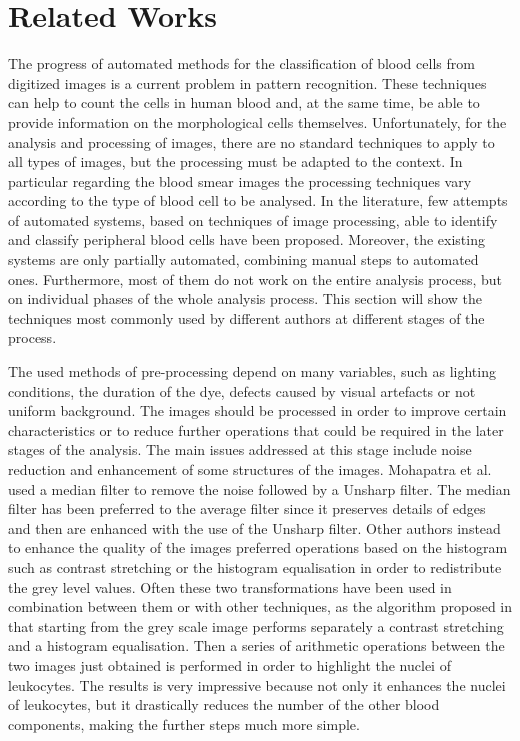 \documentclass[final,a4paper,12pt,english]{UnicaPhdThesis3}
\begin{document}
\section {Related Works}
The progress of automated methods for the classification of blood cells from digitized images is a current problem in pattern recognition. These techniques can help to count the cells in human blood and, at the same time, be able to provide information on the morphological cells themselves. Unfortunately, for the analysis and processing of images, there are no standard techniques to apply to all types of images, but the processing must be adapted to the context. In particular regarding the blood smear images the processing techniques vary according to the type of blood cell to be analysed. In the literature, few attempts of automated systems, based on techniques of image processing, able to identify and classify peripheral blood cells have been proposed. Moreover, the existing systems are only partially automated, combining manual steps to automated ones. Furthermore, most of them do not work on the entire analysis process, but on individual phases of the whole analysis process. This section will show the techniques most commonly used by different authors at different stages of the process. 

The used methods of pre-processing depend on many variables, such as lighting conditions, the duration of the dye, defects caused by visual artefacts or not uniform background. The images should be processed in order to improve certain characteristics or to reduce further operations that could be required in the later stages of the analysis. The main issues addressed at this stage include noise reduction and enhancement of some structures of the images. Mohapatra et al. \cite{Mohapatra10a,Mohapatra10b,Mohapatra10c,Mohapatra14} used a median filter to remove the noise followed by a Unsharp filter. The median filter has been preferred to the average filter since it preserves details of edges and then are enhanced with the use of the Unsharp filter. Other authors instead to enhance the quality of the images preferred operations based on the histogram such as contrast stretching or the histogram equalisation in order to redistribute the grey level values. Often these two transformations have been used in combination between them or with other techniques, as the algorithm proposed in \cite{Madhloom} that starting from the grey scale image performs separately a contrast stretching and a histogram equalisation. Then a series of arithmetic operations between the two images just obtained is performed in order to highlight the nuclei of leukocytes. The results is very impressive because not only it
enhances the nuclei of leukocytes, but it drastically reduces the number of the other blood components, making the further steps much more simple.
\end{document}
